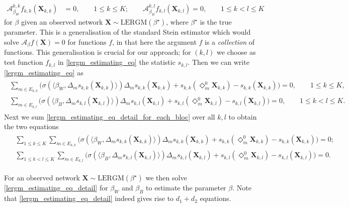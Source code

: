 \documentclass{article}
\begin{document}
\begin{align} \label{lergm_estimating_eq}
    \mathcal{A}_{\beta_W}^{k,k}f_{k,k}(\mathbf{X}_{k,k})&=0, \qquad 1\leq k  \leq K;  \quad \quad  \mathcal{A}_{\beta_B}^{k,l}f_{k,l}(\mathbf{X}_{k,l})=0, \qquad 1\leq k < l \leq K
\end{align}
for $\beta$ given an observed network $\mathbf{X} \sim \mathrm{LERGM}(\beta^\star)$, where $\beta^\star$ is the true parameter. This is a generalisation of the standard Stein estimator which would solve 
$ \mathcal{A}_{\beta}f(\mathbf{X})=0$ for functions $f$, 
in that here the argument $f$ is a {\it collection} of functions.  This generalisation is crucial for our approach; 
for $(k,l)$ we choose as test function $f_{k,l}$ in \eqref{lergm_estimating_eq} the statistic  $s_{k,l}$. Then we can write \eqref{lergm_estimating_eq} as
\begin{align} \label{lergm_estimating_eq_detail_for_each_bloc}
\begin{split}
    \sum_{m\in E_{k,k}} \big( \sigma ( \langle \beta_W , \Delta_m s_{k,k}(\mathbf{X}_{k,k}) \rangle )  \Delta_m s_{k,k}(\mathbf{X}_{k,k}) +  s_{k,k}(\Diamond_{m}^{0}\mathbf{X}_{k,k}) - s_{k,k}(\mathbf{X}_{k,k}) \big)  = 0,  \qquad 1\leq k  \leq K, \\
   \sum_{m\in E_{k,l}}  \big( \sigma ( \langle \beta_B , \Delta_m s_{k,l}(\mathbf{X}_{k,l}) \rangle )  \Delta_m s_{k,l}(\mathbf{X}_{k,l}) +  s_{k,l}(\Diamond_{m}^{0}\mathbf{X}_{k,l}) - s_{k,l}(\mathbf{X}_{k,l}) \big)   = 0, \qquad 1\leq k < l \leq K.
\end{split}
\end{align}
Next we sum \eqref{lergm_estimating_eq_detail_for_each_bloc} over all $k,l$ to obtain the two equations 
\begin{align} \label{lergm_estimating_eq_detail}
\begin{split}
    & \sum_{1 \leq k\leq K}  \sum_{m\in E_{k,k}} \big( \sigma ( \langle \beta_W , \Delta_m s_{k,k}(\mathbf{X}_{k,k}) \rangle )  \Delta_m s_{k,k}(\mathbf{X}_{k,k}) +  s_{k,k}(\Diamond_{m}^{0}\mathbf{X}_{k,k}) - s_{k,k}(\mathbf{X}_{k,k})  \big) = 0; \\
     &   
    \sum_{1 \leq k <  l \leq K}  \sum_{m\in E_{k,l}} \big( \sigma ( \langle \beta_B , \Delta_m s_{k,l}(\mathbf{X}_{k,l}) \rangle )  \Delta_m s_{k,l}(\mathbf{X}_{k,l}) +  s_{k,l}(\Diamond_{m}^{0}\mathbf{X}_{k,l}) - s_{k,l}(\mathbf{X}_{k,l}) \big) = 0.
\end{split}
\end{align}

For an observed network $\mathbf{X} \sim \mathrm{LERGM}(\beta^\star)$ we then solve \eqref{lergm_estimating_eq_detail} for $\beta_W $ and $\beta_B$ to estimate the parameter $\beta$. Note that \eqref{lergm_estimating_eq_detail} indeed gives rise to $d_1+d_2$ equations.
\end{document}
